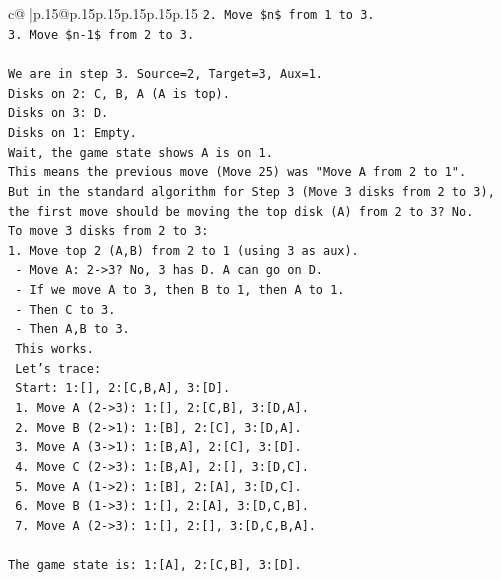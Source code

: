 \documentclass{article}
\begin{document}
{\begin{supertabular}{c@{$\;$}|p{.15\linewidth}@{}p{.15\linewidth}p{.15\linewidth}p{.15\linewidth}p{.15\linewidth}p{.15\linewidth}}
{{{\texttt{2. Move \$n\$ from 1 to 3.} \\
\texttt{3. Move \$n{-}1\$ from 2 to 3.} \\
\\ 
\texttt{We are in step 3. Source=2, Target=3, Aux=1.} \\
\texttt{Disks on 2: C, B, A (A is top).} \\
\texttt{Disks on 3: D.} \\
\texttt{Disks on 1: Empty.} \\
\texttt{Wait, the game state shows A is on 1.} \\
\texttt{This means the previous move (Move 25) was "Move A from 2 to 1".} \\
\texttt{But in the standard algorithm for Step 3 (Move 3 disks from 2 to 3), the first move should be moving the top disk (A) from 2 to 3? No.} \\
\texttt{To move 3 disks from 2 to 3:} \\
\texttt{1. Move top 2 (A,B) from 2 to 1 (using 3 as aux).} \\
\texttt{   {-} Move A: 2{-}>3? No, 3 has D. A can go on D.} \\
\texttt{   {-} If we move A to 3, then B to 1, then A to 1.} \\
\texttt{   {-} Then C to 3.} \\
\texttt{   {-} Then A,B to 3.} \\
\texttt{   This works.} \\
\texttt{   Let's trace:} \\
\texttt{   Start: 1:{[}{]}, 2:{[}C,B,A{]}, 3:{[}D{]}.} \\
\texttt{   1. Move A (2{-}>3): 1:{[}{]}, 2:{[}C,B{]}, 3:{[}D,A{]}.} \\
\texttt{   2. Move B (2{-}>1): 1:{[}B{]}, 2:{[}C{]}, 3:{[}D,A{]}.} \\
\texttt{   3. Move A (3{-}>1): 1:{[}B,A{]}, 2:{[}C{]}, 3:{[}D{]}.} \\
\texttt{   4. Move C (2{-}>3): 1:{[}B,A{]}, 2:{[}{]}, 3:{[}D,C{]}.} \\
\texttt{   5. Move A (1{-}>2): 1:{[}B{]}, 2:{[}A{]}, 3:{[}D,C{]}.} \\
\texttt{   6. Move B (1{-}>3): 1:{[}{]}, 2:{[}A{]}, 3:{[}D,C,B{]}.} \\
\texttt{   7. Move A (2{-}>3): 1:{[}{]}, 2:{[}{]}, 3:{[}D,C,B,A{]}.} \\
\\ 
\texttt{The game state is: 1:{[}A{]}, 2:{[}C,B{]}, 3:{[}D{]}.} \\
}}}
\end{supertabular}}
\end{document}
